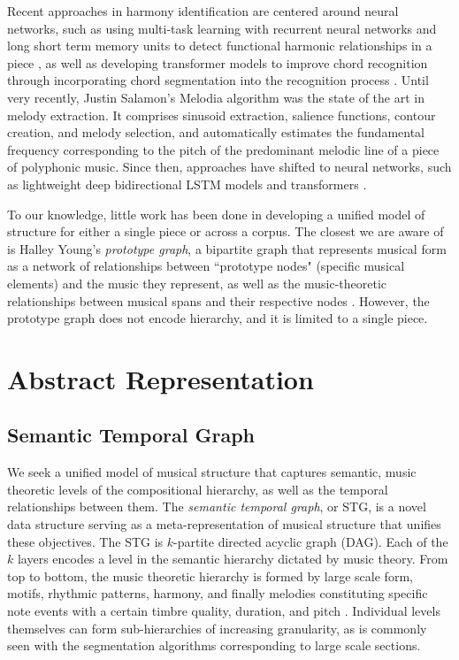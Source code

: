 \documentclass{article}
\begin{document}
Recent approaches in harmony identification are centered around neural networks, such as using multi-task
learning with recurrent neural networks and long short term memory units to detect functional harmonic relationships in a piece \cite{chen_2018_harmony}, as well as developing transformer models to improve chord recognition through incorporating chord segmentation into the recognition process \cite{chen_2019_harmony}. Until very recently, Justin Salamon's Melodia algorithm was the state of the art in melody extraction. It comprises sinusoid extraction, salience functions, contour creation, and melody selection, and automatically estimates the fundamental frequency corresponding to the pitch of the predominant melodic line of a piece of polyphonic music. Since then, approaches have shifted to neural networks, such as lightweight deep bidirectional
LSTM models \cite{kosta_22_melody} and transformers \cite{midibert}.

To our knowledge, little work has been done in developing a unified model of structure for either a single piece or across a corpus. The closest we are aware of is Halley Young's \textit{prototype graph}, a bipartite graph that represents musical form as a network of relationships between ``prototype nodes" (specific musical elements) and the music they represent, as well as the music-theoretic relationships between musical spans and their respective nodes \cite{young_2022}. However, the prototype graph does not encode hierarchy, and it is limited to a single piece.


\section{Abstract Representation}\label{sec:representation}


\subsection{Semantic Temporal Graph} \label{subsec:st_graph}
We seek a unified model of musical structure that captures semantic, music theoretic levels of the compositional hierarchy, as well as the temporal relationships between them. The \textit{semantic temporal graph}, or STG, is a novel data structure serving as a meta-representation of musical structure that unifies these objectives. The STG is $k$-partite directed acyclic graph (DAG). Each of the $k$ layers encodes a level in the semantic hierarchy dictated by music theory. From top to bottom, the music theoretic hierarchy is formed by large scale form, motifs, rhythmic patterns, harmony, and finally melodies constituting specific note events with a certain timbre quality, duration, and pitch \cite{msaf}. Individual levels themselves can form sub-hierarchies of increasing granularity, as is commonly seen with the segmentation algorithms corresponding to large scale sections.
\end{document}
